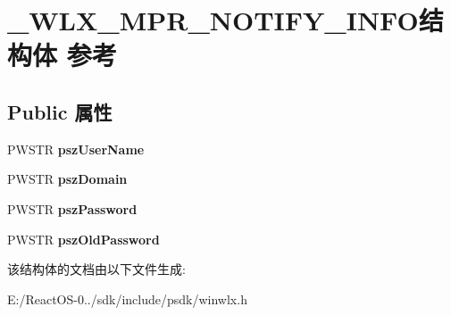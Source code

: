 \hypertarget{struct___w_l_x___m_p_r___n_o_t_i_f_y___i_n_f_o}{}\section{\+\_\+\+W\+L\+X\+\_\+\+M\+P\+R\+\_\+\+N\+O\+T\+I\+F\+Y\+\_\+\+I\+N\+F\+O结构体 参考}
\label{struct___w_l_x___m_p_r___n_o_t_i_f_y___i_n_f_o}
\subsection*{Public 属性}
\begin{DoxyCompactItemize}
\item 
\mbox{\label{struct___w_l_x___m_p_r___n_o_t_i_f_y___i_n_f_o_a06e02bd97aa52012177a47e9092f8fc3}} 
P\+W\+S\+TR {\bfseries psz\+User\+Name}
\item 
\mbox{\label{struct___w_l_x___m_p_r___n_o_t_i_f_y___i_n_f_o_aee2b27374e4db2492dcfb9303e94276b}} 
P\+W\+S\+TR {\bfseries psz\+Domain}
\item 
\mbox{\label{struct___w_l_x___m_p_r___n_o_t_i_f_y___i_n_f_o_a355c783937aeea85aa9dc6b5f43cb026}} 
P\+W\+S\+TR {\bfseries psz\+Password}
\item 
\mbox{\label{struct___w_l_x___m_p_r___n_o_t_i_f_y___i_n_f_o_af59dc21bb9f3d3e61c9c32295b3bc60b}} 
P\+W\+S\+TR {\bfseries psz\+Old\+Password}
\end{DoxyCompactItemize}


该结构体的文档由以下文件生成\+:\begin{DoxyCompactItemize}
\item 
E\+:/\+React\+O\+S-\/0../sdk/include/psdk/winwlx.\+h\end{DoxyCompactItemize}
